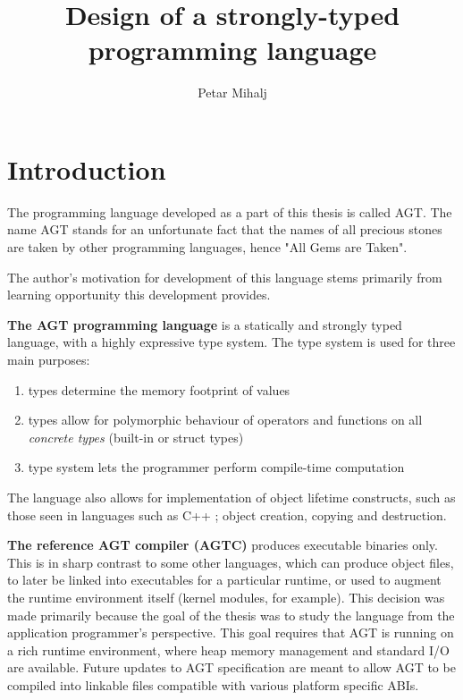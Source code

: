 \documentclass[times, utf8, diplomski]{fer}
\theoremstyle{definition}
\begin{document}
\sloppy
{}

\title{Design of a strongly-typed programming language}

\author{Petar Mihalj}

\maketitle




\tableofcontents

\chapter{Introduction}\label{chap:intro}

The programming language developed as a part of this thesis is called AGT.
The name AGT stands for an unfortunate fact that the names of all precious stones
are taken by other programming languages, hence "All Gems are Taken".

The author's motivation for development of this language stems 
primarily from learning opportunity this development provides.

\textbf{The AGT programming language} is a statically and 
strongly \citep{c_strong_typing} typed language, with a highly expressive type system.
The type system is used for three main purposes:

\begin{enumerate}
    \item types determine the memory footprint of values 
    \item types allow for polymorphic behaviour of operators and functions on all 
        \textit{concrete types} (built-in or struct types)
    \item type system lets the programmer perform compile-time computation
\end{enumerate}

The language also allows for implementation of object lifetime constructs, 
such as those seen in languages such as C++ \citep{c_cpp_lifetime}; 
object creation, copying and destruction.

\textbf{The reference AGT compiler (AGTC)} produces executable binaries only.
This is in sharp contrast to some other languages, which can produce object files, 
to later be linked into executables for a particular runtime, 
or used to augment the runtime environment itself (kernel modules, for example). 
This decision was made primarily because the goal of the thesis was to study the language 
from the application programmer's perspective. 
This goal requires that AGT is running on a rich runtime environment, 
where heap memory management and standard I/O are available.
Future updates to AGT specification are meant to allow AGT to be compiled
into linkable files compatible with various platform specific ABIs.
\end{document}
